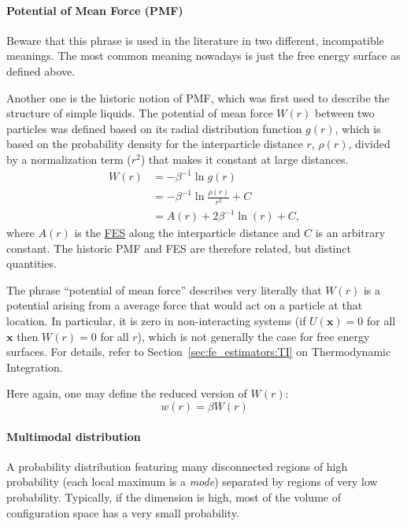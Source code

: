 \documentclass[9pt,review]{livecoms}
\newcommand{\vx}{\mathbf{x}}
\begin{document}
\paragraph{Potential of Mean Force (PMF)}
Beware that this phrase is used in the literature in two different, incompatible meanings. The most common meaning nowadays is just the free energy surface as defined above.

Another one is the historic notion of PMF, which was first used to describe the structure of simple liquids.
The potential of mean force $W(r)$ between two particles was defined based on its radial distribution function $g(r)$, which is based on the probability density for the interparticle distance $r$, $\rho(r)$, divided by a normalization term ($r^2$) that makes it constant at large distances.
\begin{align}
    W(r) &= -\beta^{-1} \ln g(r) \nonumber \\
    &= -\beta^{-1} \ln \frac{\rho(r)}{r^2} + C  \nonumber \\
    &= A(r) + 2 \beta^{-1} \ln(r) + C,
    \label{eq:pmf_fes}
\end{align}
where $A(r)$ is the \hyperlink{ref:FES} {FES} along the interparticle distance and $C$ is an arbitrary constant.
The historic PMF and FES are therefore related, but distinct quantities.

The phrase ``potential of mean force'' describes very literally that $W(r)$ is a potential arising from a average force that would act on a particle at that location. In particular, it is zero in non-interacting systems (if $U(\vx) = 0$ for all $\vx$ then $W(r) = 0$ for all $r$), which is not generally the case for free energy surfaces.
For details, refer to Section~\ref{sec:fe_estimators:TI} on Thermodynamic Integration.

Here again, one may define the reduced version of $W(r)$:
\begin{equation}
    w(r) = \beta W(r)
\end{equation}

\paragraph{Multimodal distribution}
A probability distribution featuring many disconnected regions of high probability (each local maximum is a \textit{mode}) separated by regions of very low probability. Typically, if the dimension is high, most of the volume of configuration space has a very small probability.
\end{document}
